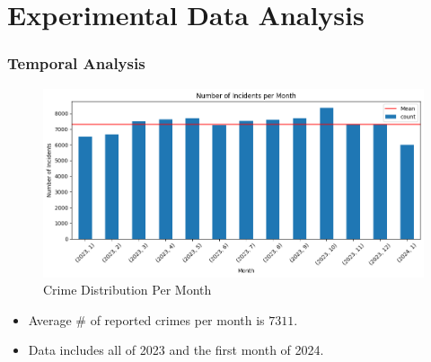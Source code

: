\documentclass{beamer}
\begin{document}


\section{Experimental Data Analysis}
\begin{frame}
    \frametitle{Temporal Analysis}
    \begin{minipage}[c]{0.7\textwidth}
        \begin{figure}
            \centering
            \includegraphics[width=\linewidth]{Figures/Number of Incidents Per Month.png}
            \caption{Crime Distribution Per Month}
        \end{figure}
    \end{minipage}\hfill
    \begin{minipage}[c]{0.3\textwidth}
        {\scriptsize %
        \begin{itemize}
            \item Average \# of reported crimes per month is $7311$.
            \item Data includes all of 2023 and the first month of 2024.
        \end{itemize}
        }
    \end{minipage}

\end{frame}
\end{document}
